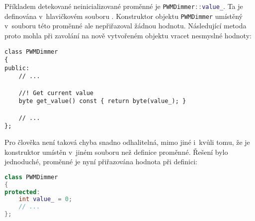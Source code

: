 Příkladem detekované neinicializované proměnné je
\lstinline[language=C++]!PWMDimmer::value_!. Ta je definována v~hlavičkovém
souboru . Konstruktor objektu
\texttt{PWMDimmer} umístěný v~souboru 
této proměnné ale nepřiřazoval žádnou hodnotu. Následující metoda proto mohla
při zavolání na nově vytvořeném objektu vracet nesmyslné hodnoty:
\begin{lstlisting}[language=myC++]
class PWMDimmer
{
public:
    // ...

    //! Get current value
    byte get_value() const { return byte(value_); }

    // ...
};
\end{lstlisting}
Pro člověka není taková chyba snadno odhalitelná, mimo jiné i~kvůli tomu,
že je konstruktor umístěn v~jiném souboru než definice proměnné.
Řešení bylo jednoduché, proměnné je nyní přiřazována hodnota při definici:
\begin{lstlisting}[language=C++]
class PWMDimmer
{
protected:
    int value_ = 0;
    // ...
};
\end{lstlisting}

\nocite{platformioDocs}
